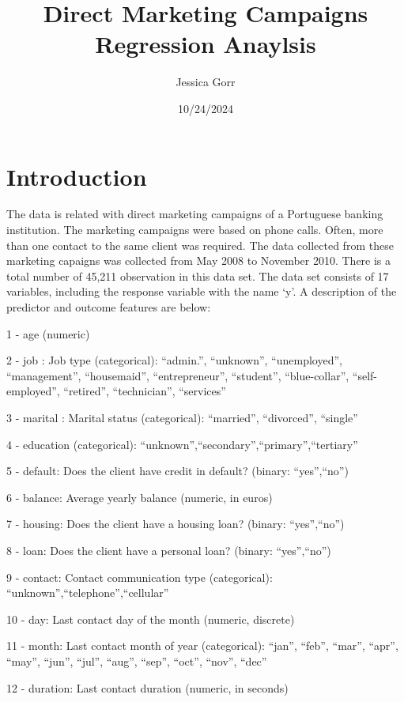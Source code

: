 \documentclass[
]{article}
\title{Direct Marketing Campaigns Regression Anaylsis}
\author{Jessica Gorr}
\date{10/24/2024}
\begin{document}
\maketitle

{
\setcounter{tocdepth}{4}
\tableofcontents
}
\hfill\break

\section{Introduction}\label{introduction}

The data is related with direct marketing campaigns of a Portuguese
banking institution. The marketing campaigns were based on phone calls.
Often, more than one contact to the same client was required. The data
collected from these marketing capaigns was collected from May 2008 to
November 2010. There is a total number of 45,211 observation in this
data set. The data set consists of 17 variables, including the response
variable with the name `y'. A description of the predictor and outcome
features are below:

1 - age (numeric)

2 - job : Job type (categorical): ``admin.'', ``unknown'',
``unemployed'', ``management'', ``housemaid'', ``entrepreneur'',
``student'', ``blue-collar'', ``self-employed'', ``retired'',
``technician'', ``services''

3 - marital : Marital status (categorical): ``married'', ``divorced'',
``single''

4 - education (categorical):
``unknown'',``secondary'',``primary'',``tertiary''

5 - default: Does the client have credit in default? (binary:
``yes'',``no'')

6 - balance: Average yearly balance (numeric, in euros)

7 - housing: Does the client have a housing loan? (binary:
``yes'',``no'')

8 - loan: Does the client have a personal loan? (binary: ``yes'',``no'')

9 - contact: Contact communication type (categorical):
``unknown'',``telephone'',``cellular''

10 - day: Last contact day of the month (numeric, discrete)

11 - month: Last contact month of year (categorical): ``jan'', ``feb'',
``mar'', ``apr'', ``may'', ``jun'', ``jul'', ``aug'', ``sep'', ``oct'',
``nov'', ``dec''

12 - duration: Last contact duration (numeric, in seconds)
\end{document}
